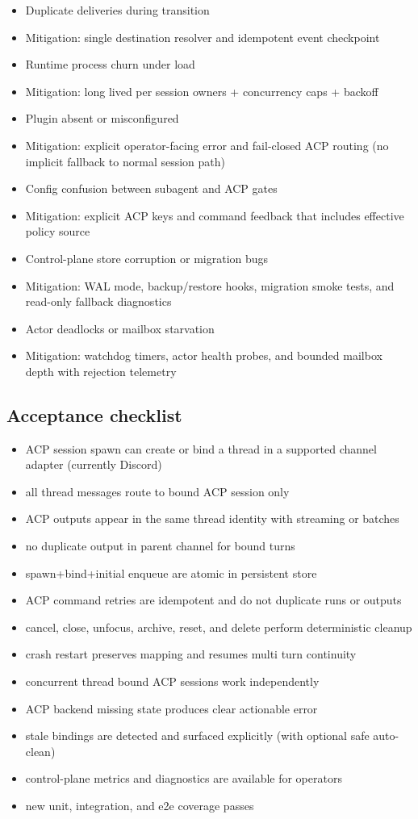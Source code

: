 \begin{itemize}
  \item Duplicate deliveries during transition
  \item Mitigation: single destination resolver and idempotent event checkpoint
  \item Runtime process churn under load
  \item Mitigation: long lived per session owners + concurrency caps + backoff
  \item Plugin absent or misconfigured
  \item Mitigation: explicit operator-facing error and fail-closed ACP routing (no implicit fallback to normal session path)
  \item Config confusion between subagent and ACP gates
  \item Mitigation: explicit ACP keys and command feedback that includes effective policy source
  \item Control-plane store corruption or migration bugs
  \item Mitigation: WAL mode, backup/restore hooks, migration smoke tests, and read-only fallback diagnostics
  \item Actor deadlocks or mailbox starvation
  \item Mitigation: watchdog timers, actor health probes, and bounded mailbox depth with rejection telemetry
\end{itemize}


\subsection{Acceptance checklist}


\begin{itemize}
  \item ACP session spawn can create or bind a thread in a supported channel adapter (currently Discord)
  \item all thread messages route to bound ACP session only
  \item ACP outputs appear in the same thread identity with streaming or batches
  \item no duplicate output in parent channel for bound turns
  \item spawn+bind+initial enqueue are atomic in persistent store
  \item ACP command retries are idempotent and do not duplicate runs or outputs
  \item cancel, close, unfocus, archive, reset, and delete perform deterministic cleanup
  \item crash restart preserves mapping and resumes multi turn continuity
  \item concurrent thread bound ACP sessions work independently
  \item ACP backend missing state produces clear actionable error
  \item stale bindings are detected and surfaced explicitly (with optional safe auto-clean)
  \item control-plane metrics and diagnostics are available for operators
  \item new unit, integration, and e2e coverage passes
\end{itemize}


